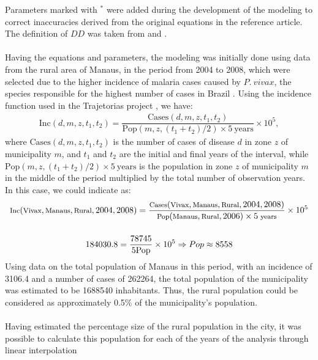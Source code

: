 \vspace{1cm}
Parameters marked with $^*$ were added during the development of the modeling to correct 
inaccuracies derived from the original equations in the reference article.
The definition of $DD$ was taken from \cite{McCord2016} and \cite{10665-41724}.
\\\\
Having the equations and parameters, the modeling was initially done using data from the 
rural area of Manaus, in the period from 2004 to 2008, which were selected due to the 
higher incidence of malaria cases caused by $P. \ vivax$, 
the species responsible for the highest number of cases in Brazil 
\cite{OliveiraFerreira2010, 10.3389/fpubh.2021.647754}. Using the incidence 
function used in the Trajetorias project \cite{Rorato2023}, we have:
\begin{gather*}
    \text{Inc}(d, m, z, t_1, t_2) = \dfrac{\text{Cases}(d, m, z, t_1, t_2)}{\text{Pop}(m,z,(t_1+t_2)/2) \times 5 \ \text{years}} \times 10^5,
\end{gather*}
where $\text{Cases}(d, m, z, t_1, t_2)$ is the number of cases of disease $d$ in zone $z$ of municipality 
$m$, and $t_1$ and $t_2$ are the initial and final years of the interval, while 
$\text{Pop}(m,z,(t_1+t_2)/2) \times 5 \ \text{years}$ is the population in zone $z$ 
of municipality $m$ in the middle of the period multiplied by the total number 
of observation years. In this case, we could indicate as:
\begin{gather*}
    \footnotesize{\text{Inc}(\text{Vivax}, \text{Manaus}, \text{Rural}, 2004, 2008) = \dfrac{\text{Cases}(\text{Vivax}, \text{Manaus}, \text{Rural}, 2004, 2008)}{\text{Pop}(\text{Manaus}, \text{Rural}, 2006) \times 5 \ \text{years}} \times 10^5}  \\\\
    184030.8 = \dfrac{78745}{5\text{Pop}} \times 10^5 \Rightarrow Pop \approx 8558
\end{gather*}
Using data on the total population of Manaus in this period, 
with an incidence of 3106.4 and a number of cases of 262264, the 
total population of the municipality was estimated to be 1688540 
inhabitants. Thus, the rural population could be considered as 
approximately 0.5$\%$ of the municipality's population.
\\\\
Having estimated the percentage size of the rural population 
in the city, it was possible to calculate this population for 
each of the years of the analysis through linear interpolation 
